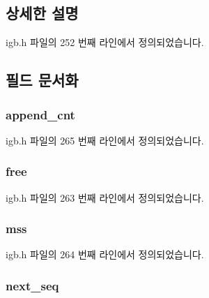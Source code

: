 \subsection{상세한 설명}


igb.\+h 파일의 252 번째 라인에서 정의되었습니다.



\subsection{필드 문서화}
\subsubsection[{\texorpdfstring{append\+\_\+cnt}{append_cnt}}]{ append\+\_\+cnt}\hypertarget{structigb__cb_af22de63020dfb0f793d6977597ccf2f1}{}\label{structigb__cb_af22de63020dfb0f793d6977597ccf2f1}


igb.\+h 파일의 265 번째 라인에서 정의되었습니다.

\subsubsection[{\texorpdfstring{free}{free}}]{ free}\hypertarget{structigb__cb_a24de8aeebd1f3d6f108fd2af030181ca}{}\label{structigb__cb_a24de8aeebd1f3d6f108fd2af030181ca}


igb.\+h 파일의 263 번째 라인에서 정의되었습니다.

\subsubsection[{\texorpdfstring{mss}{mss}}]{ mss}\hypertarget{structigb__cb_a5a39225232f88c889685cc7054ee1ee6}{}\label{structigb__cb_a5a39225232f88c889685cc7054ee1ee6}


igb.\+h 파일의 264 번째 라인에서 정의되었습니다.

\subsubsection[{\texorpdfstring{next\+\_\+seq}{next_seq}}]{ next\+\_\+seq}\hypertarget{structigb__cb_a852338c2885d19f26893336dad9e8e26}{}\label{structigb__cb_a852338c2885d19f26893336dad9e8e26}


